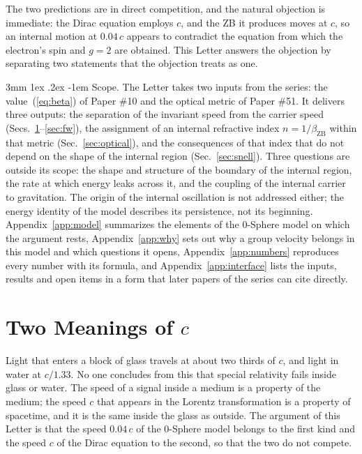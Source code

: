 \documentclass[%
 reprint, amsmath,amssymb, aps, prb, ]{revtex4-2}
\makeatletter
\numberwithin{equation}{section}
\renewcommand\paragraph{%
  \@startsection{paragraph}{4}{\z@}%
    {3mm \@plus 1ex \@minus .2ex}%
    {-1em}%
    {\normalfont\normalsize\itshape}}
\makeatother
\begin{document}
The two predictions are in direct competition, and the natural objection is immediate: the Dirac equation employs $c$, and the ZB it produces moves at $c$, so an internal motion at $0.04\,c$ appears to contradict the equation from which the electron's spin and $g=2$ are obtained. This Letter answers the objection by separating two statements that the objection treats as one.

\paragraph{Scope.} The Letter takes two inputs from the series: the value~(\ref{eq:beta}) of Paper \#10 and the optical metric of Paper \#51. It delivers three outputs: the separation of the invariant speed from the carrier speed (Secs.~\ref{sec:two}--\ref{sec:fw}), the assignment of an internal refractive index $n = 1/\beta_{\text{ZB}}$ within that metric (Sec.~\ref{sec:optical}), and the consequences of that index that do not depend on the shape of the internal region (Sec.~\ref{sec:snell}). Three questions are outside its scope: the shape and structure of the boundary of the internal region, the rate at which energy leaks across it, and the coupling of the internal carrier to gravitation. The origin of the internal oscillation is not addressed either; the energy identity of the model describes its persistence, not its beginning. Appendix~\ref{app:model} summarizes the elements of the 0-Sphere model on which the argument rests, Appendix~\ref{app:why} sets out why a group velocity belongs in this model and which questions it opens, Appendix~\ref{app:numbers} reproduces every number with its formula, and Appendix~\ref{app:interface} lists the inputs, results and open items in a form that later papers of the series can cite directly.

\section{Two Meanings of $c$}
\label{sec:two}

Light that enters a block of glass travels at about two thirds of $c$, and light in water at $c/1.33$. No one concludes from this that special relativity fails inside glass or water. The speed of a signal inside a medium is a property of the medium; the speed $c$ that appears in the Lorentz transformation is a property of spacetime, and it is the same inside the glass as outside. The argument of this Letter is that the speed $0.04\,c$ of the 0-Sphere model belongs to the first kind and the speed $c$ of the Dirac equation to the second, so that the two do not compete.
\end{document}
